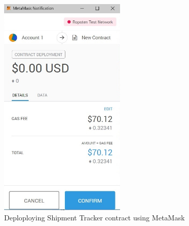 \begin{figure}[h]
	\centering
    \includegraphics[width=60mm,scale=0.5]{figs/STC}
	\caption{Deploploying Shipment Tracker contract using MetaMask}
	\label{fig:STC} 
\end{figure}

